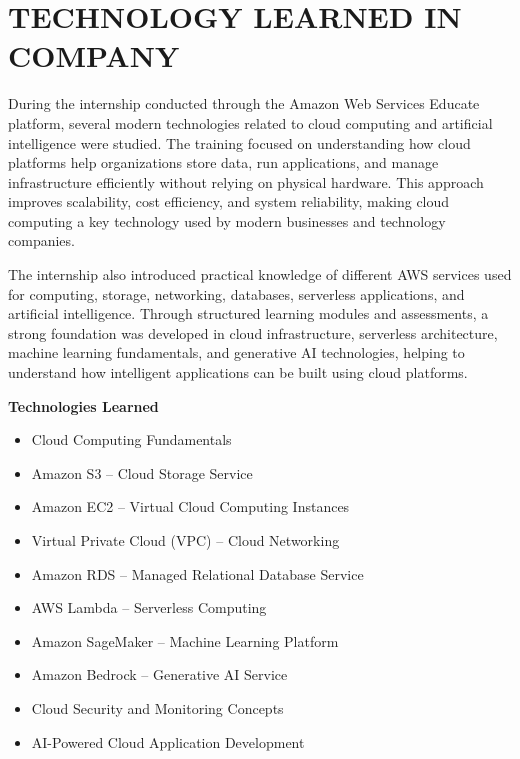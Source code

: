 \documentclass[12pt, a4paper, oneside]{report}
\begin{document}
\chapter{TECHNOLOGY LEARNED IN COMPANY}

During the internship conducted through the Amazon Web Services Educate platform, 
several modern technologies related to cloud computing and artificial intelligence 
were studied. The training focused on understanding how cloud platforms help 
organizations store data, run applications, and manage infrastructure efficiently without 
relying on physical hardware. This approach improves scalability, cost efficiency, and 
system reliability, making cloud computing a key technology used by modern 
businesses and technology companies.

The internship also introduced practical knowledge of different AWS services used for 
computing, storage, networking, databases, serverless applications, and artificial 
intelligence. Through structured learning modules and assessments, a strong foundation 
was developed in cloud infrastructure, serverless architecture, machine learning 
fundamentals, and generative AI technologies, helping to understand how intelligent 
applications can be built using cloud platforms.

\medskip
\noindent \textbf{Technologies Learned}

\begin{itemize}[leftmargin=1.5cm]
    \item Cloud Computing Fundamentals
    \item Amazon S3 -- Cloud Storage Service
    \item Amazon EC2 -- Virtual Cloud Computing Instances
    \item Virtual Private Cloud (VPC) -- Cloud Networking
    \item Amazon RDS -- Managed Relational Database Service
    \item AWS Lambda -- Serverless Computing
    \item Amazon SageMaker -- Machine Learning Platform
    \item Amazon Bedrock -- Generative AI Service
    \item Cloud Security and Monitoring Concepts
    \item AI-Powered Cloud Application Development
\end{itemize}


\end{document}
